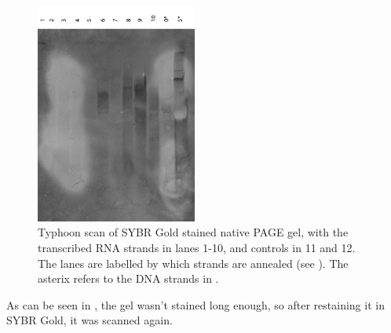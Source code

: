 \begin{figure}[H]
\centering
\includegraphics[width=200]{images/translator_transcription_1.png}
\caption{Typhoon scan of SYBR Gold stained native PAGE gel, with the transcribed RNA strands in lanes 1-10, and controls in 11 and 12. The lanes are labelled by which strands are annealed (see ). The asterix refers to the DNA strands in .}
\label{transcription_1}
\end{figure}

As can be seen in , the gel wasn't stained long enough, so after restaining it in SYBR Gold, it was scanned again.

